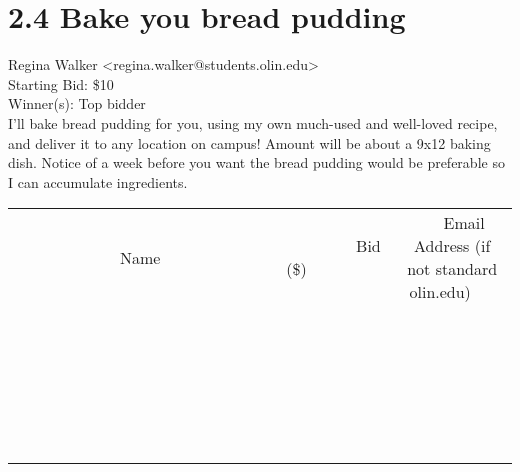 \documentclass[11pt]{article}
\begin{document}
					\section*{2.4 Bake you bread pudding}
					Regina Walker <regina.walker@students.olin.edu> \\
					Starting Bid: \$10 \\
					Winner(s): Top bidder \\
					I'll bake bread pudding for you, using my own much-used and well-loved recipe, and deliver it to any location on campus! Amount will be about a 9x12 baking dish. Notice of a week before you want the bread pudding would be preferable so I can accumulate ingredients. \\
					[6ex]
					\begin{tabular}{c c c}
						~~~~~~~~~~~~~Name~~~~~~~~~~~~~ & ~~~~~~~~~Bid (\$)~~~~~~~~~ & ~~~Email Address (if not standard olin.edu)~~~ \\
				
 & & \\
\hline
 & & \\
\hline
 & & \\
\hline
 & & \\
\hline
 & & \\
\hline
 & & \\
\hline
 & & \\
\hline
 & & \\
\hline
 & & \\
\hline
 & & \\
\hline
 & & \\
\hline
 & & \\
\hline
 & & \\
\hline
 & & \\
\hline
 & & \\
\hline
 & & \\
\hline
 & & \\
\hline
 & & \\
\hline
 & & \\
\hline
 & & \\
\hline
 & & \\
\hline
 & & \\
\hline
 & & \\
\hline
 & & \\
\hline
 & & \\
\hline
 & & \\
\hline
					\end{tabular}
					\clearpage
				
\end{document}
